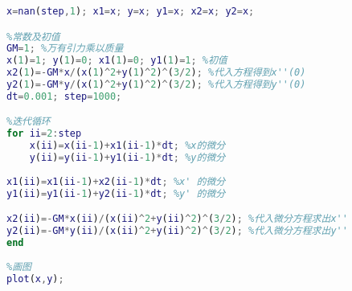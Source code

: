 \begin{lstlisting}[language=Matlab]
%预赋值
x=nan(step,1); x1=x; y=x; y1=x; x2=x; y2=x;

%常数及初值
GM=1; %万有引力乘以质量
x(1)=1; y(1)=0; x1(1)=0; y1(1)=1; %初值 
x2(1)=-GM*x/(x(1)^2+y(1)^2)^(3/2); %代入方程得到x''(0)
y2(1)=-GM*y/(x(1)^2+y(1)^2)^(3/2); %代入方程得到y''(0)
dt=0.001; step=1000;

%迭代循环
for ii=2:step
    x(ii)=x(ii-1)+x1(ii-1)*dt; %x的微分
    y(ii)=y(ii-1)+y1(ii-1)*dt; %y的微分
    
x1(ii)=x1(ii-1)+x2(ii-1)*dt; %x' 的微分
y1(ii)=y1(ii-1)+y2(ii-1)*dt; %y' 的微分

x2(ii)=-GM*x(ii)/(x(ii)^2+y(ii)^2)^(3/2); %代入微分方程求出x''
y2(ii)=-GM*y(ii)/(x(ii)^2+y(ii)^2)^(3/2); %代入微分方程求出y''
end
 
%画图
plot(x,y);
\end{lstlisting}